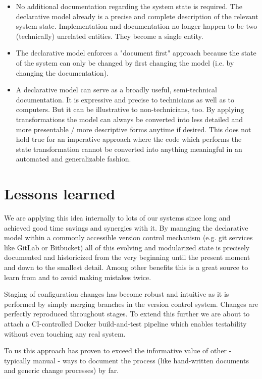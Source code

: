 \documentclass[12pt, a4paper]{article}
\begin{document}
\begin{itemize}
  \item No additional documentation regarding the system state is required. The declarative model already is a precise and complete description of the relevant system state. Implementation and documentation no longer happen to be two (technically) unrelated entities. They become a single entity.

  \item The declarative model enforces a "document first" approach because the state of the system can only be changed by first changing the model (i.e. by changing the documentation).

  \item A declarative model can serve as a broadly useful, semi-technical documentation. It is expressive and precise to technicians as well as to computers. But it can be illustrative to non-technicians, too. By applying transformations the model can always be converted into less detailed and more presentable / more descriptive forms anytime if desired. This does not hold true for an imperative approach where the code which performs the state transformation cannot be converted into anything meaningful in an automated and generalizable fashion.
\end{itemize}

\section{Lessons learned}
We are applying this idea internally to lots of our systems since long and achieved good time savings and synergies with it. By managing the declarative model within a commonly accessible version control mechanism (e.g. git services like GitLab or Bitbucket) all of this evolving and modularized state is precisely documented and historicized from the very beginning until the present moment and down to the smallest detail. Among other benefits this is a great source to learn from and to avoid making mistakes twice.

Staging of configuration changes has become robust and intuitive as it is performed by simply merging branches in the version control system. Changes are perfectly reproduced throughout stages. To extend this further we are about to attach a CI-controlled Docker build-and-test pipeline which enables testability without even touching any real system.

To us this approach has proven to exceed the informative value of other - typically manual - ways to document the process (like hand-written documents and generic change processes) by far.
\end{document}
